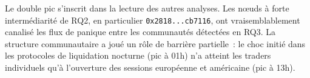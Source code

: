 Le double pic s'inscrit dans la lecture des autres analyses. Les n\oe{}uds \`a forte interm\'ediarit\'e de RQ2, en particulier \texttt{0x2818...cb7116}, ont vraisemblablement canalis\'e les flux de panique entre les communaut\'es d\'etect\'ees en RQ3. La structure communautaire a jou\'e un r\^ole de barri\`ere partielle~: le choc initi\'e dans les protocoles de liquidation nocturne (pic \`a 01h) n'a atteint les traders individuels qu'\`a l'ouverture des sessions europ\'eenne et am\'ericaine (pic \`a 13h).
